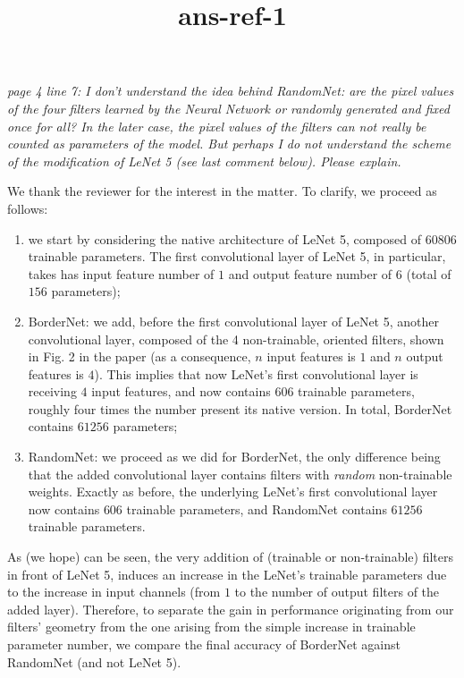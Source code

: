 \documentclass[a4paper, 10pt]{article}
\title{ans-ref-1}
\author{}
\begin{document}
\maketitle
\emph{
  page 4 line 7: I don’t understand the idea behind RandomNet: are the pixel
  values of the four filters learned by the Neural Network or randomly generated
  and fixed once for all? In the later case, the pixel values of the filters can
  not really be counted as parameters of the model. But perhaps I do not
  understand the scheme of the modification of LeNet 5 (see last comment below).
  Please explain.
}

We thank the reviewer for the interest in the matter. To clarify, we proceed as
follows: 
\begin{enumerate}
  \item we start by considering the native architecture of LeNet 5, composed of
    $60806$ trainable parameters. The first convolutional layer of LeNet
    5, in particular, takes has input feature number of $1$ and output feature
    number of $6$ (total of $156$ parameters);
  \item BorderNet: we add, before the first convolutional layer of LeNet 5,
    another convolutional layer, composed of the 4 non-trainable, oriented
    filters, shown in Fig. 2 in the paper (as a consequence, $n$ input features
    is $1$ and $n$ output features is $4$). This implies that now LeNet's first
    convolutional layer is receiving $4$ input features, and now contains $606$ 
    trainable parameters, roughly four times the number present its native
    version. In total, BorderNet contains $61256$ parameters;
  \item RandomNet: we proceed as we did for BorderNet, the only difference being
    that the added convolutional layer contains filters with \emph{random}
    non-trainable weights. Exactly as before, the underlying LeNet's first
    convolutional layer now contains $606$ trainable parameters, and RandomNet
    contains $61256$ trainable parameters.
\end{enumerate}
As (we hope) can be seen, the very addition of (trainable or non-trainable)
filters in front of LeNet 5, induces an increase in the LeNet's trainable
parameters due to the increase in input channels (from $1$ to the number of 
output filters of the added layer). Therefore, to separate the gain in
performance originating from our filters' geometry from the one arising from 
the simple increase in trainable parameter number, we compare the final accuracy
of BorderNet against RandomNet (and not LeNet 5).
\end{document}
